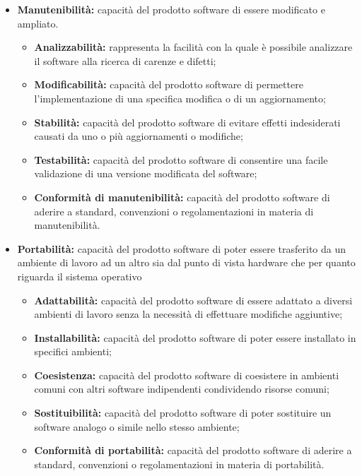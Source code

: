 \documentclass[a4paper]{article}
\begin{document}
\begin{itemize}
					\item \textbf{Manutenibilità:} capacità del prodotto software di essere modificato e ampliato.
					\begin{itemize}
						\item \textbf{Analizzabilità:} rappresenta la facilità con la quale è possibile analizzare il software alla
						ricerca di carenze e difetti;
						\item \textbf{Modificabilità:} capacità del prodotto software di permettere l'implementazione di una
						specifica modifica o di un aggiornamento;
						\item \textbf{Stabilità:} capacità del prodotto software di evitare effetti indesiderati causati da uno o
						più aggiornamenti o modifiche;
						\item \textbf{Testabilità:} capacità del prodotto software di consentire una facile validazione di una
						versione modificata del software;
						\item \textbf{Conformità di manutenibilità:} capacità del prodotto software di aderire a standard,
						convenzioni o regolamentazioni in materia di manutenibilità.
					\end{itemize}										
					
					\item \textbf{Portabilità:} capacità del prodotto software di poter essere trasferito da un ambiente di lavoro
					ad un altro sia dal punto di vista hardware che per quanto riguarda il sistema operativo
					\begin{itemize}
						\item \textbf{Adattabilità:} capacità del prodotto software di essere adattato a diversi ambienti di
						lavoro senza la necessità di effettuare modifiche aggiuntive;
						\item \textbf{Installabilità:} capacità del prodotto software di poter essere installato in specifici
						ambienti;
						\item \textbf{Coesistenza:} capacità del prodotto software di coesistere in ambienti comuni con altri
						software indipendenti condividendo risorse comuni;
						\item \textbf{Sostituibilità:} capacità del prodotto software di poter sostituire un software analogo o
						simile nello stesso ambiente;
						\item \textbf{Conformità di portabilità:} capacità del prodotto software di aderire a standard,
						convenzioni o regolamentazioni in materia di portabilità.
					\end{itemize}										
					
				\end{itemize}
\end{document}
